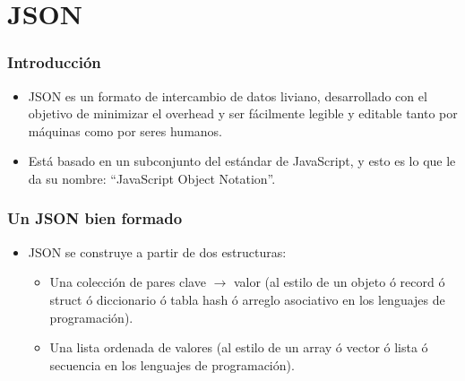 \section{JSON}
\begin{frame}
\frametitle{Introducción}
\begin{itemize}
\item	JSON es un formato de intercambio de datos liviano, desarrollado con el objetivo de minimizar el overhead y ser fácilmente legible y editable tanto por máquinas como por seres humanos.
		\pause
\item	Está basado en un subconjunto del estándar de JavaScript, y esto es lo que le da su nombre: ``JavaScript Object Notation''.
\end{itemize}
\end{frame}

\begin{frame}
\frametitle{Un JSON bien formado}
\begin{itemize}
\item	JSON se construye a partir de dos estructuras:
		\pause
\begin{itemize}
		\item	Una colección de pares clave $\rightarrow$ valor (al estilo de un objeto ó record ó struct ó diccionario ó tabla hash ó arreglo asociativo en los lenguajes de programación).
				\pause
		\item	Una lista ordenada de valores (al estilo de un array ó vector ó lista ó secuencia en los lenguajes de programación).
\end{itemize}
\end{itemize}
\end{frame}

